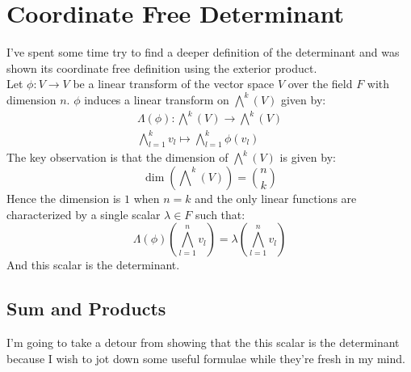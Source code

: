 
\section{Coordinate Free Determinant}
I've spent some time try to find a deeper definition of the determinant and was shown its coordinate free definition using the exterior product.
\\

Let $\phi:V\rightarrow V$ be a linear transform of the vector space $V$ over the field $F$ with dimension $n$.
$\phi$ induces a linear transform on $\bigwedge^k(V)$ given by:
\[\begin{aligned}
	\Lambda(\phi):\bigwedge\nolimits^k(V)\rightarrow\bigwedge\nolimits^k(V)\\
	\bigwedge^k_{l=1}v_l \mapsto \bigwedge^k_{l=1}\phi(v_l)
\end{aligned}\]
The key observation is that the dimension of $\bigwedge^k(V)$ is given by:
\[\dim\left(\bigwedge\nolimits^k(V)\right) = \binom{n}{k}\]
Hence the dimension is $1$ when $n=k$ and the only linear functions are characterized by a single scalar $\lambda \in F$ such that:
\[\Lambda(\phi)\left(\bigwedge^n_{l=1}v_l\right) = \lambda\left(\bigwedge^n_{l=1}v_l\right)\]
And this scalar is the determinant.

\subsection{Sum and Products}
I'm going to take a detour from showing that the this scalar is the determinant because I wish to jot down some useful formulae while they're fresh in my mind.
\\

